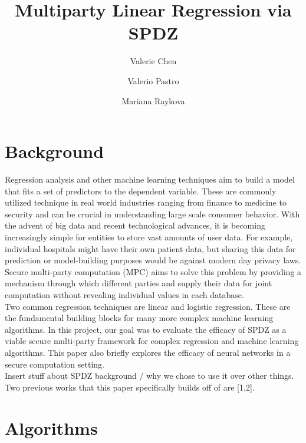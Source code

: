 \documentclass{article}
\title{Multiparty Linear Regression via SPDZ}
\author{Valerie Chen \and Valerio Pastro \and Mariana Raykova}
\date{}
\theoremstyle{plain}
\theoremstyle{definition}
\theoremstyle{remark}
\begin{document}
\maketitle

\section{Background}

Regression analysis and other machine learning techniques aim to build a model that fits a set of predictors to the dependent variable. These are commonly utilized technique in real world industries ranging from finance to medicine to security and can be crucial in understanding large scale consumer behavior. With the advent of big data and recent technological advances, it is becoming increasingly simple for entities to store vast amounts of user data. For example, individual hospitals might have their own patient data, but sharing this data for prediction or model-building purposes would be against modern day privacy laws. Secure multi-party computation (MPC) aims to solve this problem by providing a mechanism through which different parties and supply their data for joint computation without revealing individual values in each database.\\

\noindent
Two common regression techniques are linear and logistic regression. These are the fundamental building blocks for many more complex machine learning algorithms. In this project, our goal was to evaluate the efficacy of SPDZ as a viable secure multi-party framework for complex regression and machine learning algorithms. This paper also briefly explores the efficacy of neural networks in a secure computation setting.\\

\noindent
Insert stuff about SPDZ background / why we chose to use it over other things. \\ 

\noindent
Two previous works that this paper specifically builds off of are [1,2]. 

\section{Algorithms}
\end{document}
